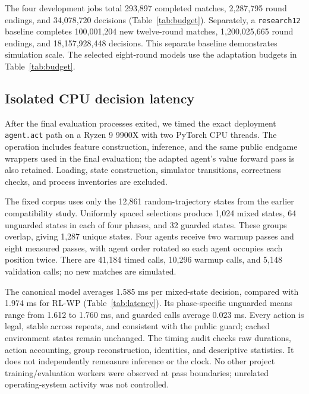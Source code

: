 \documentclass[11pt]{article}
\begin{document}
\begin{table}[ht]
\centering\small

\caption{Actual terminal-event counts in the fixed development training.
Warmup is included; matches can cross the warmup/policy-update boundary.}
\label{tab:budget}
\end{table}

The four development jobs total 293,897 completed matches, 2,287,795 round
endings, and 34,078,720 decisions (Table~\ref{tab:budget}). Separately, a
\texttt{research12} baseline completes 100,001,204 new twelve-round matches,
1,200,025,665 round endings, and 18,157,928,448 decisions. This separate baseline demonstrates simulation scale. The selected
eight-round models use the adaptation budgets in Table~\ref{tab:budget}.

\subsection{Isolated CPU decision latency}
After the final evaluation processes exited, we timed the exact deployment
\texttt{agent.act} path on a Ryzen 9 9900X with two PyTorch CPU threads.
The operation includes feature construction, inference, and the same public
endgame wrappers used in the final evaluation; the adapted agent's value
forward pass is also retained. Loading, state construction, simulator
transitions, correctness checks, and process inventories are excluded.

The fixed corpus uses only the 12,861 random-trajectory states from the earlier
compatibility study. Uniformly spaced selections produce 1,024 mixed states,
64 unguarded states in each of four phases, and 32 guarded states. These
groups overlap, giving 1,287 unique states. Four agents receive two warmup
passes and eight measured passes, with agent order rotated so each agent
occupies each position twice. There are 41,184 timed calls, 10,296 warmup
calls, and 5,148 validation calls; no new matches are simulated.

\begin{table}[ht]
\centering\small

\caption{CPU decision latency on the 1,024-state mixed corpus: 8,192 timed
calls per agent. Quantiles describe repeated cached calls, not uncertainty
over independent games or hardware environments.}
\label{tab:latency}
\end{table}

The canonical model averages 1.585 ms per mixed-state decision, compared with
1.974 ms for RL-WP (Table~\ref{tab:latency}). Its phase-specific unguarded
means range from 1.612 to 1.760 ms, and guarded calls average 0.023 ms.
Every action is legal, stable across repeats, and consistent with the public
guard; cached environment states remain unchanged. The timing audit checks
raw durations, action accounting, group reconstruction, identities, and
descriptive statistics. It does not independently remeasure inference or
the clock. No other project training/evaluation workers were observed at pass
boundaries; unrelated operating-system activity was not controlled.
\end{document}
